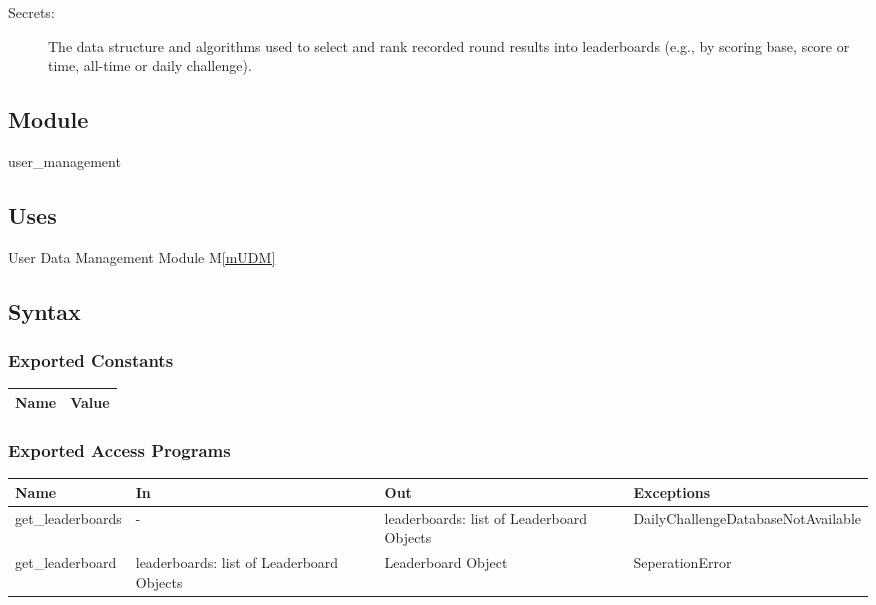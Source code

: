 \documentclass[12pt, titlepage]{article}
\newcommand{\mref}[1]{M\ref{#1}}
\begin{document}
\begin{description}
\item[Secrets:] The data structure and algorithms used to select and rank recorded round results into leaderboards (e.g., by scoring base, score or time, all-time or daily challenge).
\end{description}

\subsection{Module}

user\_management

\subsection{Uses}

User Data Management Module \mref{mUDM}

\subsection{Syntax}

\subsubsection{Exported Constants}

\begin{center}
\begin{tabular}{p{10cm} p{4cm}}
\hline
\textbf{Name} & \textbf{Value}\\
\hline


\hline
\end{tabular}
\end{center}

\subsubsection{Exported Access Programs}

\begin{center}
\begin{tabular}{p{4cm} p{4cm} p{4cm} p{4cm}}
\hline
\textbf{Name} & \textbf{In} & \textbf{Out} & \textbf{Exceptions} \\
\hline
get\_leaderboards & - & leaderboards: list of Leaderboard Objects & DailyChallengeDatabaseNotAvailable \\
get\_leaderboard & leaderboards: list of Leaderboard Objects & Leaderboard Object & SeperationError \\
\hline
\end{tabular}
\end{center}
\end{document}
